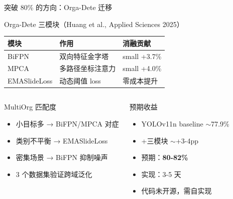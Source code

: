 \documentclass[aspectratio=169, 10pt]{beamer}
\begin{document}
\begin{frame}{突破 80\% 的方向：Orga-Dete 迁移}
  \begin{block}{Orga-Dete 三模块（Huang et al., Applied Sciences 2025）}
    \begin{tabular}{lll}
      \toprule
      模块 & 作用 & 消融贡献 \\
      \midrule
      BiFPN & 双向特征金字塔 & small +3.7\% \\
      MPCA & 多路径坐标注意力 & small +4.0\% \\
      EMASlideLoss & 动态阈值 loss & 零成本提升 \\
      \bottomrule
    \end{tabular}
  \end{block}
  \begin{columns}[T]
    \begin{block}{MultiOrg 匹配度}
      \begin{itemize}
        \item[\checkmark] 小目标多 → BiFPN/MPCA 对症
        \item[\checkmark] 类别不平衡 → EMASlideLoss
        \item[\checkmark] 密集场景 → BiFPN 抑制噪声
        \item[\checkmark] 3 个数据集验证跨域泛化
      \end{itemize}
    \end{block}
    \begin{alertblock}{预期收益}
      \begin{itemize}
        \item YOLOv11n baseline $\sim$77.9\%
        \item +三模块 $\sim$+3-4pp
        \item 预期：\textbf{80-82\%}
        \item 实现：3-5 天
        \item 代码未开源，需自实现
      \end{itemize}
    \end{alertblock}
  \end{columns}
\end{frame}
\end{document}
